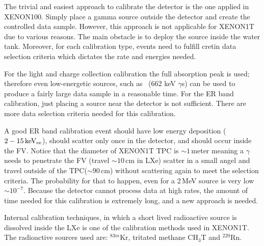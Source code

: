 The trivial and easiest approach to calibrate the detector is the one applied in XENON100. Simply place a gamma source outside the detector and create the controlled data sample. However, this approach is not applicable for XENON1T due to various reasons. The main obstacle is to deploy the source inside the water tank. Moreover, for each calibration type, events need to fulfill cretin data selection criteria which dictates the rate and energies needed. 

For the light and charge collection calibration the full absorption peak is used; therefore even low-energetic sources, such as \Cs\ (662 keV $\gamma$s) can be used to produce a fairly large data sample in a reasonable time. For the ER band calibration, just placing a source near the detector is not sufficient. There are more  data selection criteria needed for this calibration. 

A good ER band calibration event should have low energy deposition ($2-15\,\mathrm{keV_\mathrm{ee}}$), should scatter only once in the detector, and should occur inside the FV. Notice that the diameter of XENON1T TPC is $\sim 1$\,meter meaning a $\gamma$ needs to penetrate the FV (travel $\sim 10$\,cm in LXe) scatter in a small angel and travel outside of the TPC($\sim 90$\,cm) without scattering again to meet the selection criteria. The probability for that to happen, even for a 2\,MeV source is very low $\sim 10^{-7}$. Because the detector cannot process data at high rates, the amount of time needed for this calibration is extremely long, and a new approach is needed.

Internal calibration techniques, in which a short lived radioactive source is dissolved inside the LXe is one of the calibration methods used in XENON1T. The radioactive sources used are: $^{83m}\mathrm{Kr}$, tritated methane $\mathrm{CH_3T}$ and $^{220}\mathrm{Rn}$.    





